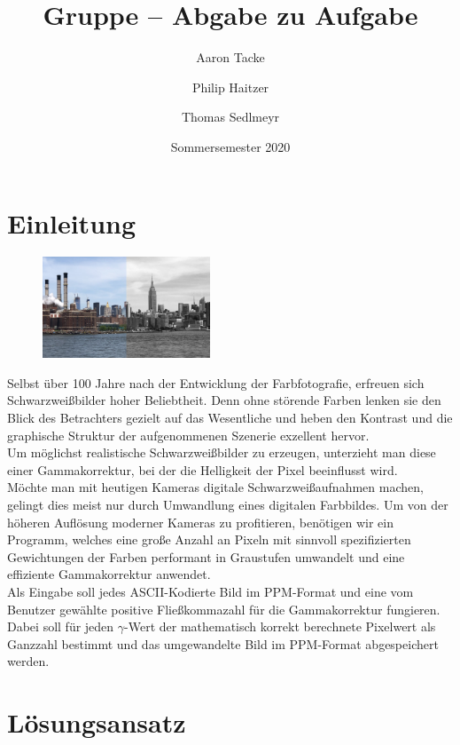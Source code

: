 \documentclass[course=erap]{aspdoc}
\author{Aaron Tacke \and Philip Haitzer \and Thomas Sedlmeyr}
\date{Sommersemester 2020} %
\title{Gruppe \theGroup{} -- Abgabe zu Aufgabe \theNumber}
\begin{document}
	\maketitle

	\section{Einleitung}

	\begin{figure}
		\includegraphics[width=5cm]{Images/gammaBeispiel.jpg}
	\end{figure}
	Selbst über 100 Jahre nach der Entwicklung der Farbfotografie, erfreuen sich Schwarzweißbilder hoher Beliebtheit. Denn ohne störende Farben lenken sie den Blick des Betrachters gezielt auf das Wesentliche und heben den Kontrast und die graphische Struktur der aufgenommenen Szenerie exzellent hervor.\\
	Um möglichst realistische Schwarzweißbilder zu erzeugen, unterzieht man diese einer Gammakorrektur, bei der die Helligkeit der Pixel beeinflusst wird.\\

	\noindent Möchte man mit heutigen Kameras digitale Schwarzweißaufnahmen machen, gelingt dies meist nur durch Umwandlung eines digitalen Farbbildes. Um von der höheren Auflösung moderner Kameras zu profitieren, benötigen wir ein Programm, welches eine große Anzahl an Pixeln mit sinnvoll spezifizierten Gewichtungen der Farben performant in Graustufen umwandelt und eine effiziente Gammakorrektur anwendet.\\

	\noindent Als Eingabe soll jedes ASCII-Kodierte Bild im PPM-Format und eine vom Benutzer gewählte positive Fließkommazahl für die Gammakorrektur fungieren. Dabei soll für jeden $\gamma$-Wert der mathematisch korrekt berechnete Pixelwert als Ganzzahl bestimmt und das umgewandelte Bild im PPM-Format abgespeichert werden.


	\section{Lösungsansatz}
\end{document}
